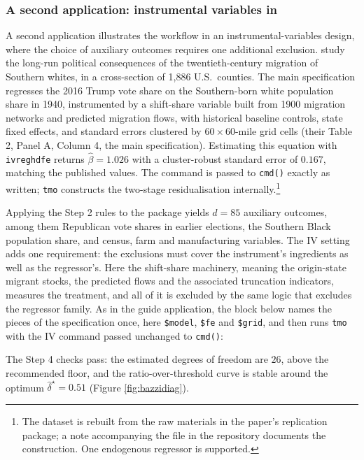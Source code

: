 \documentclass[varwidth,bib]{statapress}
\begin{document}
\subsubsection{A second application: instrumental variables in \texorpdfstring{\citet{Bazzietal2023}}{Bazzi et al. (2023)}}
\label{sscn:iv}
A second application illustrates the workflow in an instrumental-variables design, where the choice of auxiliary outcomes requires one additional exclusion.  \citet{Bazzietal2023} study the long-run political consequences of the twentieth-century migration of Southern whites, in a cross-section of 1,886 U.S.\ counties.  The main specification regresses the 2016 Trump vote share on the Southern-born white population share in 1940, instrumented by a shift-share variable built from 1900 migration networks and predicted migration flows, with historical baseline controls, state fixed effects, and standard errors clustered by $60\times 60$-mile grid cells (their Table 2, Panel A, Column 4, the main specification).  Estimating this equation with {\tt ivreghdfe} returns $\widehat\beta = 1.026$ with a cluster-robust standard error of $0.167$, matching the published values.  The command is passed to {\tt cmd()} exactly as written; {\tt tmo} constructs the two-stage residualisation internally.\footnote{The dataset is rebuilt from the raw materials in the paper's replication package; a note accompanying the file in the repository documents the construction.  One endogenous regressor is supported.}

Applying the Step 2 rules to the package yields $d=85$ auxiliary outcomes, among them Republican vote shares in earlier elections, the Southern Black population share, and census, farm and manufacturing variables.  The IV setting adds one requirement: the exclusions must cover the instrument's ingredients as well as the regressor's.  Here the shift-share machinery, meaning the origin-state migrant stocks, the predicted flows and the associated truncation indicators, measures the treatment, and all of it is excluded by the same logic that excludes the regressor family.  As in the guide application, the block below names the pieces of the specification once, here {\tt \$model}, {\tt \$fe} and {\tt \$grid}, and then runs {\tt tmo} with the IV command passed unchanged to {\tt cmd()}:

\begin{stlog}

\end{stlog}

The Step 4 checks pass: the estimated degrees of freedom are $26$, above the recommended floor, and the ratio-over-threshold curve is stable around the optimum $\hat\delta^\star = 0.51$ (Figure \ref{fig:bazzidiag}).
\end{document}
